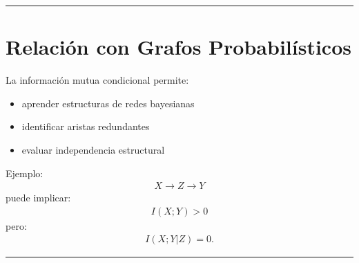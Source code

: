 \documentclass[letterpaper,10pt,english]{jupyterBook}
\begin{document}
\bigskip\hrule\bigskip



\section{Relación con Grafos Probabilísticos}
\label{\detokenize{03_multivariate_models/conditional_mi:relacion-con-grafos-probabilisticos}}
\sphinxAtStartPar
La información mutua condicional permite:
\begin{itemize}
\item {} 
\sphinxAtStartPar
aprender estructuras de redes bayesianas

\item {} 
\sphinxAtStartPar
identificar aristas redundantes

\item {} 
\sphinxAtStartPar
evaluar independencia estructural

\end{itemize}

\sphinxAtStartPar
Ejemplo:
\begin{equation*}
\begin{split}
X \rightarrow Z \rightarrow Y
\end{split}
\end{equation*}
\sphinxAtStartPar
puede implicar:
\begin{equation*}
\begin{split}
I(X;Y)>0
\end{split}
\end{equation*}
\sphinxAtStartPar
pero:
\begin{equation*}
\begin{split}
I(X;Y|Z)=0.
\end{split}
\end{equation*}

\bigskip\hrule\bigskip
\end{document}
